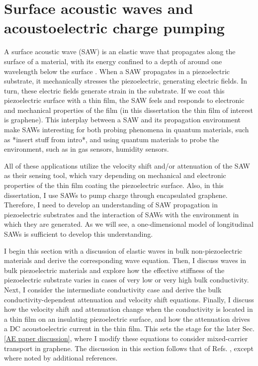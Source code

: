 \documentclass[double,12pt,1in]{beavtex}
\begin{document}
\section{Surface acoustic waves and acoustoelectric charge pumping}


A surface acoustic wave (SAW) is an elastic wave that propagates along the surface of a material, with its energy confined to a depth of around one wavelength below the surface \cite{rayleigh_waves_1885}. When a SAW propagates in a piezoelectric substrate, it mechanically stresses the piezoelectric, generating electric fields. In turn, these electric fields generate strain in the substrate. If we coat this piezoelectric surface with a thin film, the SAW feels and responds to electronic and mechanical properties of the film (in this dissertation the thin film of interest is graphene). This interplay between a SAW and its propagation environment make SAWs interesting for both probing phenomena in quantum materials, such as *insert stuff from intro*, and using quantum materials to probe the environment, such as in gas sensors, humidity sensors.

All of these applications utilize the velocity shift and/or attenuation of the SAW as their sensing tool, which vary depending on mechanical and electronic properties of the thin film coating the piezoelectric surface. Also, in this dissertation, I use SAWs to pump charge through encapsulated graphene. Therefore, I need to develop an understanding of SAW propagation in piezoelectric substrates and the interaction of SAWs with the environment in which they are generated. As we will see, a one-dimensional model of longitudinal SAWs is sufficient to develop this understanding. 

I begin this section with a discussion of elastic waves in bulk non-piezoelectric materials and derive the corresponding wave equation. Then, I discuss waves in bulk piezoelectric materials and explore how the effective stiffness of the piezoelectric substrate varies in cases of very low or very high bulk conductivity. Next, I consider the intermediate conductivity case and derive the bulk conductivity-dependent attenuation and velocity shift equations. Finally, I discuss how the velocity shift and attenuation change when the conductivity is located in a thin film on an insulating piezoelectric surface, and how the attenuation drives a DC acoustoelectric current in the thin film. This sets the stage for the later Sec. \ref{AE paper discussion}, where I modify these equations to consider mixed-carrier transport in graphene. The discussion in this section follows that of Refs. \cite{weinreich_acoustodynamic_1956, hutson_elastic_1962, wixforth_surface_1989}, except where noted by additional references.
\end{document}
